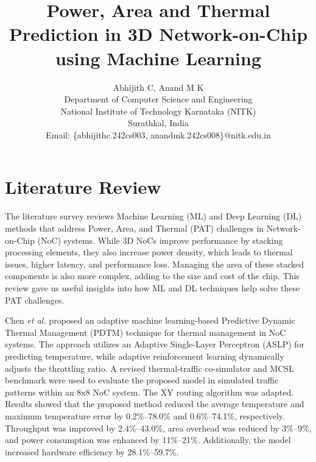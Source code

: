 \documentclass[conference]{IEEEtran}
\begin{document}
\title{Power, Area and Thermal Prediction in 3D Network-on-Chip using Machine Learning}

\author{Abhijith C, Anand M K \\

Department of Computer Science and Engineering \\ 
	National Institute of Technology Karnataka (NITK) \\ 
	Surathkal, India\\
Email: \{abhijithc.242cs003, anandmk.242cs008\}@nitk.edu.in}


\maketitle

\section{Literature Review}
The literature survey reviews Machine Learning (ML) and Deep Learning (DL) methods that address Power, Area, and Thermal (PAT) challenges in Network-on-Chip (NoC) systems. While 3D NoCs improve performance by stacking processing elements, they also increase power density, which leads to thermal issues, higher latency, and performance loss. Managing the area of these stacked components is also more complex, adding to the size and cost of the chip. This review gave us useful insights into how ML and DL techniques help solve these PAT challenges.

Chen \textit{et al.}\cite{1} proposed an adaptive machine learning-based Predictive Dynamic Thermal Management (PDTM) technique for thermal management in NoC systems. The approach utilizes an Adaptive Single-Layer Perceptron (ASLP) for predicting temperature, while adaptive reinforcement learning dynamically adjusts the throttling ratio. A revised thermal-traffic co-simulator and MCSL benchmark were used to evaluate the proposed model in simulated traffic patterns within an 8x8 NoC system. The XY routing algorithm was adapted. Results showed that the proposed method reduced the average temperature and maximum temperature error by 0.2\%–78.0\% and 0.6\%–74.1\%, respectively. Throughput was improved by 2.4\%–43.0\%, area overhead was reduced by 3\%–9\%, and power consumption was enhanced by 11\%–21\%. Additionally, the model increased hardware efficiency by 28.1\%–59.7\%.
\end{document}
